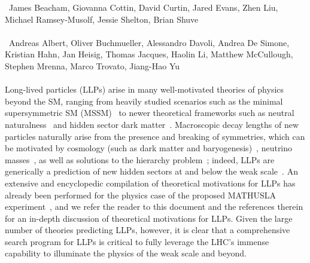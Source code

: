 ~James Beacham, Giovanna Cottin, David Curtin, Jared Evans, Zhen Liu, Michael Ramsey-Musolf, Jessie Shelton, Brian Shuve \\
\text{ \; }\\
~Andreas Albert, Oliver Buchmueller, Alessandro Davoli, Andrea De Simone, Kristian Hahn, Jan Heisig, Thomas Jacques, Haolin Li, Matthew McCullough, Stephen Mrenna, Marco Trovato, Jiang-Hao Yu
\text{ \; }\\
\text{ \; }\\


\noindent Long-lived particles (LLPs) arise in many well-motivated theories of physics beyond the SM, ranging from  heavily studied scenarios such as the minimal supersymmetric SM (MSSM)~\cite{Fayet:1976et,Fayet:1977yc,Farrar:1978xj,Fayet:1979sa,Dimopoulos:1981zb} to newer theoretical frameworks such as neutral naturalness~\cite{Chacko:2005pe,Burdman:2006tz,Cai:2008au} and hidden sector dark matter~\cite{Boehm:2002yz,Boehm:2003ha,Pospelov:2007mp,Pospelov:2008zw,ArkaniHamed:2008qn,Pospelov:2008jd}.
Macroscopic decay lengths of new particles naturally arise from the presence and breaking of symmetries, which can be motivated by cosmology (such as dark matter and baryogenesis)~\cite{Bouquet:1986mq,Campbell:1990fa,Cui:2012jh,Barry:2013nva,Cui:2014twa,Cui:2015eba,Ipek:2016bpf,Feng:2008ya,Baumgart:2009tn,Kaplan:2009ag,Chan:2011aa,Dienes:2011ja,Dienes:2012yz,Kim:2013ivd}, neutrino masses~\cite{Fidalgo:2009dm,Ghosh:2012pq,Helo:2013esa,Antusch:2016vyf,Graesser:2007yj,Graesser:2007pc,Ghosh:2014rha,Izaguirre:2015pga,Maiezza:2015lza,Batell:2016zod,Lara:2018rwv,Cottin:2018kmq,Nemevsek:2018bbt,Curtin:2018ees}, as well as solutions to the hierarchy problem~\cite{Giudice:1998bp,Burdman:2006tz,Cai:2008au,Chacko:2005pe,Fan:2011yu,Barbier:2004ez,Csaki:2013jza,Arvanitaki:2012ps,ArkaniHamed:2012gw}; indeed, LLPs are generically a prediction of new hidden sectors at and below the weak scale~\cite{Chen:1995yu,Thomas:1998wy,Feng:1999fu,Strassler:2006im,Strassler:2006ri,Strassler:2006qa,Han:2007ae,Strassler:2008bv,Strassler:2008fv}. An extensive and encyclopedic compilation of theoretical motivations for LLPs has already been performed for the physics case of the proposed MATHUSLA experiment~\cite{Curtin:2018mvb}, and we refer the reader to this document and the references therein for an in-depth discussion of theoretical motivations for LLPs.
Given the large number of theories predicting LLPs, however, it is clear that a comprehensive search program for LLPs is critical to fully leverage the LHC's immense capability to illuminate the physics of the weak scale and beyond.

